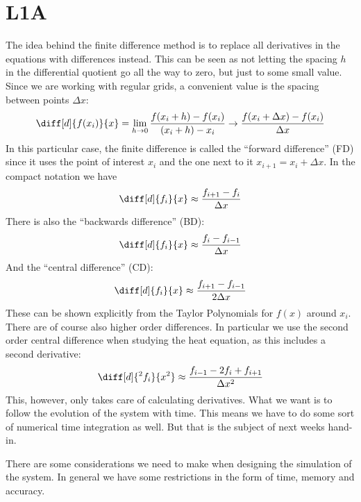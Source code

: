\documentclass[sigconf]{acmart}
\begin{document}
\section{L1A}
The idea behind the finite difference method is to replace all derivatives in the equations with differences instead. This can be seen as not letting the spacing $ h $ in the differential quotient go all the way to zero, but just to some small value. Since we are working with regular grids, a convenient value is the spacing between points $ \Delta x $:
\begin{equation}\label{key}
	\diff[d]{f(x_i)}{x} = \lim\limits_{h\to 0} \frac{f(x_i + h) - f(x_i)}{(x_i+h) - x_i} \to \frac{f(x_i + \Delta x) - f(x_i)}{\Delta x}
\end{equation}
In this particular case, the finite difference is called the ``forward difference'' (FD) since it uses the point of interest $ x_i $ and the one next to it $ x_{i+1} = x_i + \Delta x $. In the compact notation we have
\begin{equation}\label{key}
	\diff[d]{f_i}{x} \approx \frac{f_{i+1} - f_{i}}{\Delta x}
\end{equation}
There is also the ``backwards difference'' (BD):
\begin{equation}\label{key}
	\diff[d]{f_i}{x} \approx \frac{f_{i} - f_{i-1}}{\Delta x}
\end{equation}
And the ``central difference'' (CD):
\begin{equation}\label{key}
	\diff[d]{f_i}{x} \approx \frac{f_{i+1} - f_{i-1}}{2 \Delta x}
\end{equation}
These can be shown explicitly from the Taylor Polynomials for $ f(x) $ around $ x_i $. There are of course also higher order differences. In particular we use the second order central difference when studying the heat equation, as this includes a second derivative:
\begin{equation}\label{key}
	\diff[d]{^2 f_i}{x^2} \approx \frac{f_{i-1} - 2f_i + f_{i+1}}{\Delta x^2}
\end{equation}
This, however, only takes care of calculating derivatives. What we want is to follow the evolution of the system with time. This means we have to do some sort of numerical time integration as well. But that is the subject of next weeks hand-in.

There are some considerations we need to make when designing the simulation of the system. In general we have some restrictions in the form of time, memory and accuracy.
\end{document}
